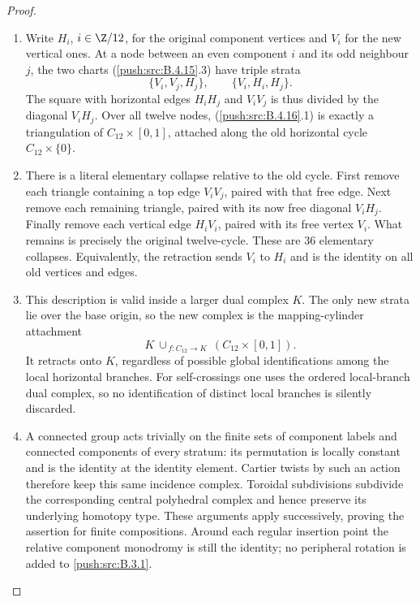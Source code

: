 \begin{proof}
\begin{enumerate}[label=\arabic*.,leftmargin=*]
\item Write $H_i$, $i\in\Z/12$, for the original component
vertices and $V_i$ for the new vertical ones. At a node
between an even component $i$ and its odd neighbour
$j$, the two charts (\ref{push:src:B.4.15}.3) have triple strata
\[
 \{V_i,V_j,H_j\},\qquad
 \{V_i,H_i,H_j\}.
 \tag{B.4.16.1}
\]
The square with horizontal edges $H_iH_j$ and $V_iV_j$
is thus divided by the diagonal $V_iH_j$. Over all
twelve nodes, (\ref{push:src:B.4.16}.1) is exactly a triangulation of
$C_{12}\times[0,1]$, attached along the old horizontal
cycle $C_{12}\times\{0\}$.

\item There is a literal elementary collapse relative to the
old cycle. First remove each triangle containing a top
edge $V_iV_j$, paired with that free edge. Next remove
each remaining triangle, paired with its now free
diagonal $V_iH_j$. Finally remove each vertical edge
$H_iV_i$, paired with its free vertex $V_i$. What remains
is precisely the original twelve-cycle. These are
$36$ elementary collapses. Equivalently, the retraction
sends $V_i$ to $H_i$ and is the identity on all old
vertices and edges.

\item This description is valid inside a larger dual complex
$K$. The only new strata lie over the base origin,
so the new complex is the mapping-cylinder attachment
\[
 K\ \cup_{\,f:C_{12}\to K}\
           (C_{12}\times[0,1]).
\]
It retracts onto $K$, regardless of possible global
identifications among the local horizontal branches.
For self-crossings one uses the ordered local-branch
dual complex, so no identification of distinct local
branches is silently discarded.

\item A connected group acts trivially on the finite sets
of component labels and connected components of every
stratum: its permutation is locally constant and is
the identity at the identity element. Cartier twists
by such an action therefore keep this same incidence
complex. Toroidal subdivisions subdivide the
corresponding central polyhedral complex and hence
preserve its underlying homotopy type. These arguments
apply successively, proving the assertion for finite
compositions. Around each regular insertion point the
relative component monodromy is still the identity;
no peripheral rotation is added to \ref{push:src:B.3.1}.


\end{enumerate}
\end{proof}
